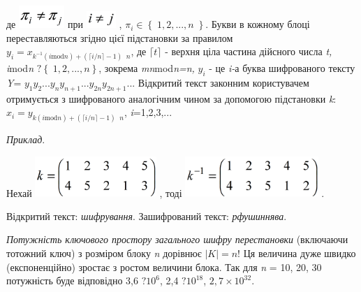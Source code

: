 \documentclass[a4paper]{article}
\newcounter{}
\begin{document}
де  \includegraphics[width=0.6811in,height=0.3339in]{crypt-img/crypt-img58.png} 
при  \includegraphics[width=0.4402in,height=0.252in]{crypt-img/crypt-img59.png}
,  ${\pi _{{i}}\in \left\{\;1,2,\text{.}\text{.}\text{.},n\;\right\}}$. Букви в
кожному блоці переставляються згідно цієї підстановки за правилом 
${y_{{i}}=x_{{k^{{-1}}(i\text{mod}n)+\left(\lceil i/n\rceil -1\right)\;\;n}}}$,
 де   ${\lceil t\rceil }$ - верхня ціла частина дійсного числа
\textit{t}\textit{,  } \textit{i}mod\textit{n }
${?\left\{\;1,2,\text{.}\text{.}\text{.},n\left.\right\}\right.}$, зокрема 
\textit{mn}mod\textit{n}\textit{=}\textit{n}\textit{, } ${y_{{i}}}$  {}- це 
\textit{i}\textit{{}-}а  буква шифрованого тексту \textit{Y}=
${y_{{1}}y_{{2}}\text{.}\text{.}\text{.}y_{{n}}y_{{n+1}}\text{.}\text{.}\text{.}y_{{2n}}y_{{2n+1}}\text{.}\text{.}\text{.}}$
Відкритий текст законним користувачем отримується з шифрованого аналогічним
чином за допомогою підстановки \textit{k}:  
${x_{{i}}=y_{{k(i\text{mod}n)+\left(\lceil i/n\rceil -1\right)\;\;n}}}$, 
\textit{i}=1,2,3,...

\textit{Приклад}. 

Нехай  
\includegraphics[width=1.8071in,height=0.598in]{crypt-img/crypt-img60.png} , 
тоді  
\includegraphics[width=1.9835in,height=0.5992in]{crypt-img/crypt-img61.png} .

Відкритий текст: \textit{шифрування}. Зашифрований текст: \textit{рфушиннява}. 

\textit{Потужність ключового простору загального шифру перестановки} (включаючи
тотожний ключ) з розміром блоку \textit{n}\textit{ }дорівнює  ${|K|=n}$!  Ця
величина дуже швидко (експоненційно)  зростає з ростом величини блока. Так для 
\textit{n}\textit{ }= 10, 20, 30  потужність буде відповідно 3,6
${?\text{10}^{{6}}}$,  2,4 ${?\text{10}^{{\text{18}}}}$,   ${2,7\times
\text{10}^{{\text{32}}}}$.
\end{document}
